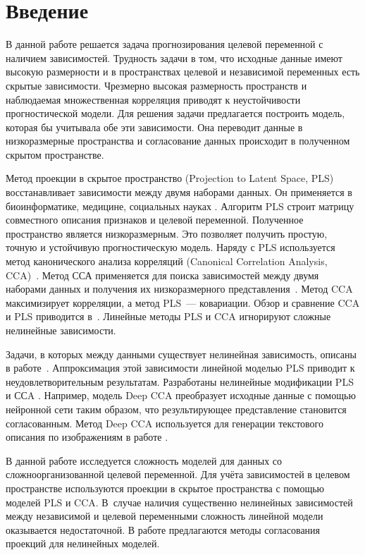 \documentclass[12pt]{article}
\begin{document}
	
	\section{Введение}
	В данной работе решается задача прогнозирования целевой переменной с наличием зависимостей. Трудность задачи в том, что исходные данные имеют высокую размерности и в пространствах целевой и независимой переменных есть скрытые зависимости. Чрезмерно высокая размерность пространств и наблюдаемая множественная корреляция приводят к неустойчивости прогностической модели. Для решения задачи предлагается построить модель, которая бы учитывала обе эти зависимости. Она переводит данные в низкоразмерные пространства и согласование данных происходит в полученном скрытом пространстве.
	
	Метод проекции в скрытое пространство (Projection to Latent Space, PLS)~\cite{overview_pls, overview_nonlinear_pls} восстанавливает зависимости между двумя наборами данных. Он применяется в биоинформатике, медицине, социальных науках \cite{1figures, btc519, PLS_in_strategic_management, PLS_application}. Алгоритм PLS строит матрицу совместного описания признаков и целевой переменной. Полученное пространство является низкоразмерным. Это позволяет получить простую, точную и устойчивую прогностическую модель. Наряду с PLS используется метод канонического анализа корреляций (Canonical Correlation Analysis, CCA)~\cite{cca_alg}. Метод ССА применяется для поиска зависимостей между двумя наборами данных и получения их низкоразмерного представления~\cite{cca_apl1, cca_apl2}. Метод CCA максимизирует корреляции, а метод PLS~--- ковариации. Обзор и сравнение CCA и PLS приводится в~\cite{overview_pls}. Линейные методы PLS и CCA игнорируют сложные нелинейные зависимости. 
	
	Задачи, в которых между данными существует нелинейная зависимость, описаны в работе~\cite{overview_nonlinear_pls}. Аппроксимация этой зависимости линейной моделью PLS приводит к неудовлетворительным результатам. Разработаны нелинейные модификации PLS~\cite{PLS_nn, PLS_rbf, PLS_ga} и ССA \cite{deep_cca, kernel_cca}. Например, модель Deep CCA \cite{deep_cca} преобразует исходные данные с помощью нейронной сети таким образом, что результирующее представление становится согласованным. Метод Deep CCA используется для генерации текстового описания по изображениям в работе \cite{kernel_cca_appl}. 
	
	В данной работе исследуется сложность моделей для данных со сложноорганизованной целевой переменной. 
	Для учёта зависимостей в целевом пространстве используются проекции в скрытое пространства с помощью моделей PLS и CCA.
	В~случае наличия существенно нелинейных зависимостей между независимой и целевой переменными сложность линейной модели оказывается недостаточной.
	В работе предлагаются методы согласования проекций для нелинейных моделей.
	
\end{document}
